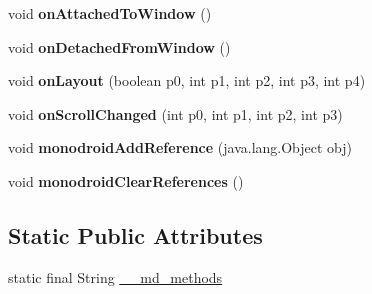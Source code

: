 \begin{DoxyCompactItemize}
void {\bfseries on\+Attached\+To\+Window} ()
\item 
\mbox{\label{classmd5b60ffeb829f638581ab2bb9b1a7f4f3f_1_1ScrollViewRenderer_a3f23bcefa3f1c0eb0cef347d894aac67}} 
void {\bfseries on\+Detached\+From\+Window} ()
\item 
\mbox{\label{classmd5b60ffeb829f638581ab2bb9b1a7f4f3f_1_1ScrollViewRenderer_a3d67ff8055c54f0f7e8b83c02e1f3e5b}} 
void {\bfseries on\+Layout} (boolean p0, int p1, int p2, int p3, int p4)
\item 
\mbox{\label{classmd5b60ffeb829f638581ab2bb9b1a7f4f3f_1_1ScrollViewRenderer_a75785a2000e6b0bdede6664ea1ab230c}} 
void {\bfseries on\+Scroll\+Changed} (int p0, int p1, int p2, int p3)
\item 
\mbox{\label{classmd5b60ffeb829f638581ab2bb9b1a7f4f3f_1_1ScrollViewRenderer_af8ce9ea3774616bef86ff56598273b4f}} 
void {\bfseries monodroid\+Add\+Reference} (java.\+lang.\+Object obj)
\item 
\mbox{\label{classmd5b60ffeb829f638581ab2bb9b1a7f4f3f_1_1ScrollViewRenderer_aade95cf62b886c7d7630bd6d29119ed1}} 
void {\bfseries monodroid\+Clear\+References} ()
\end{DoxyCompactItemize}
\subsection*{Static Public Attributes}
\begin{DoxyCompactItemize}
\item 
static final String \hyperlink{classmd5b60ffeb829f638581ab2bb9b1a7f4f3f_1_1ScrollViewRenderer_ab2b998afe39872cdd0f9f5caea97ed1c}{\+\_\+\+\_\+md\+\_\+methods}
\end{DoxyCompactItemize}
